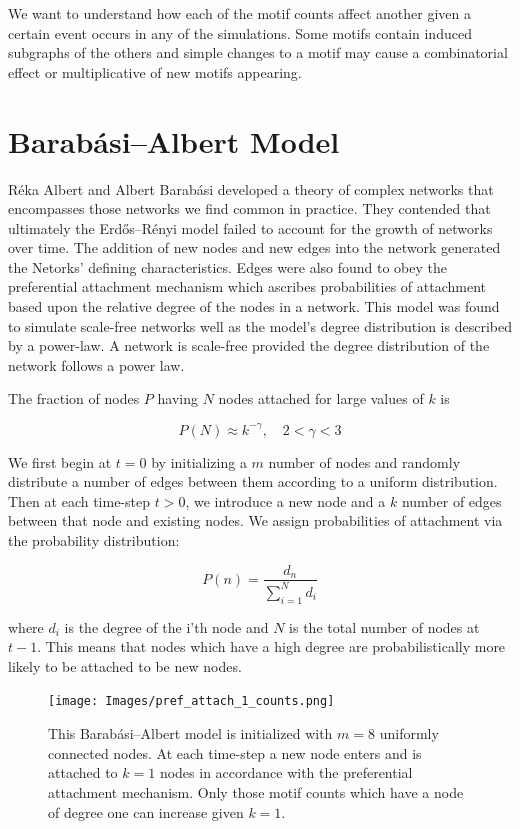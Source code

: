 We want to understand how each of the motif counts affect another given a certain event occurs
in any of the simulations. Some motifs contain induced subgraphs of the others and simple changes
to a motif may cause a combinatorial effect or multiplicative of new motifs appearing.

\chapter{Barabási–Albert Model}
\label{section:BA model}

Réka Albert and Albert Barabási developed a theory of complex networks that 
encompasses those networks we find common in practice. They contended that ultimately the 
Erdős–Rényi model failed to account for the growth of networks over time. The addition
of new nodes and new edges into the network generated the Netorks' defining characteristics.
Edges were also found to obey the preferential attachment
mechanism which ascribes probabilities of attachment based upon the relative degree of the nodes in a network. 
This model was found to simulate scale-free networks well as the model's
degree distribution is described by a power-law. 
A network is scale-free provided the degree distribution of the network follows a power law. 

The fraction of nodes $P$ having $N$ nodes attached for large values of $k$ is 

$$
P(N) \approx k^{-\gamma} , \quad 2< \gamma <3
$$

We first begin at $t=0$ by initializing a $m$ number of nodes and randomly distribute a number of edges between them
according to a uniform distribution. Then at each time-step $t > 0$, we introduce a new node 
and a $k$ number of edges between that node and existing nodes. We assign probabilities of attachment via the
 probability distribution:

$$
P(n) = \frac{d_n}{\sum^{N}_{i=1} d_i}
$$

\noindent where $d_i$ is the degree of the i'th node and $N$ is the total number of nodes at $t-1$. This means 
that nodes which have a high degree are probabilistically more likely to be attached to be new nodes. 


\begin{figure}[h!]
    \texttt{[image: Images/pref\_attach\_1\_counts.png]}
    \centering
    \caption{This Barabási–Albert model is initialized with $m=8$ uniformly connected nodes.
    At each time-step a new node enters and is attached to $k=1$ nodes in accordance
    with the preferential attachment mechanism. Only those motif counts which have a node
    of degree one can increase given $k=1$.}
    \label{fig:BA1}
\end{figure}


